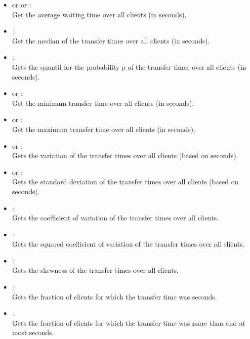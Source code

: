 \begin{itemize}

\item
{} or  or :\\
Get the average waiting time over all clients (in seconds).

\item
{}:\\
Get the median of the transfer times over all clients (in seconds).

\item
{}:\\
Gets the quantil for the probability p of the transfer times over all clients (in seconds).

\item
{} or :\\
Get the minimum transfer time over all clients (in seconds).

\item
{} or :\\
Get the maximum transfer time over all clients (in seconds).

\item
{} or :\\
Gets the variation of the transfer times over all clients (based on seconds).

\item
{} or :\\
Gets the standard deviation of the transfer times over all clients (based on seconds).

\item
{}:\\
Gets the coefficient of variation of the transfer times over all clients.

\item
{}:\\
Gets the squared coefficient of variation of the transfer times over all clients.

\item
{}:\\
Gets the skewness of the transfer times over all clients.

\item
{}:\\
Gets the fraction of clients for which the transfer time was  seconds.

\item
{}:\\
Gets the fraction of clients for which the transfer time was more than  and at most  seconds.

\end{itemize}  



